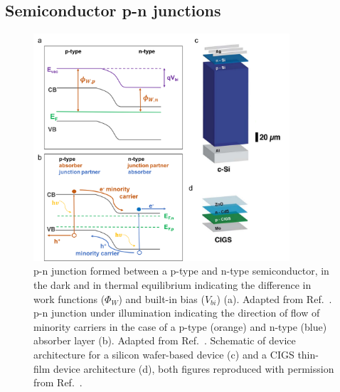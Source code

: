\documentclass[11pt, twoside]{report}
\begin{document}
\subsection{Semiconductor p-n junctions}
\begin{figure}[h!]
  \centering
    \includegraphics[width=0.85\textwidth]{figures/p-n_schematic.png}
    \caption[p-n junction formed between a p-type and n-type semiconductor, in the dark and in thermal equilibrium indicating the difference in work functions ($\Phi_W$) and built-in bias ($V_{bi}$) (a). p-n junction under illumination indicating the direction of flow of minority carriers in the case of a p-type (orange) and n-type (blue) absorber layer (b). Schematic of device architecture for a silicon wafer-based device (c) and a CIGS thin-film device architecture (d).]{p-n junction formed between a p-type and n-type semiconductor, in the dark and in thermal equilibrium indicating the difference in work functions ($\Phi_W$) and built-in bias ($V_{bi}$) (a). Adapted from Ref.~. p-n junction under illumination indicating the direction of flow of minority carriers in the case of a p-type (orange) and n-type (blue) absorber layer (b). Adapted from Ref.~. Schematic of device architecture for a silicon wafer-based device (c) and a CIGS thin-film device architecture (d), both figures reproduced with permission from Ref.~.}
  \label{p-n_schematic}
\end{figure}
\end{document}
